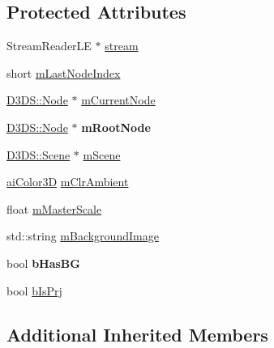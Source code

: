 \subsection*{Protected Attributes}
\begin{DoxyCompactItemize}
\item 
Stream\+Reader\+L\+E $\ast$ \hyperlink{class_assimp_1_1_discreet3_d_s_importer_a44f2ddb67a27b6cd5d82fb843061b33e}{stream}
\item 
short \hyperlink{class_assimp_1_1_discreet3_d_s_importer_a3415f396daf5ea21fcf7491d2c3068a3}{m\+Last\+Node\+Index}
\item 
\hyperlink{struct_assimp_1_1_d3_d_s_1_1_node}{D3\+D\+S\+::\+Node} $\ast$ \hyperlink{class_assimp_1_1_discreet3_d_s_importer_a8fa09748e9efd3f912c22f6fe6ff5988}{m\+Current\+Node}
\item 
\hypertarget{class_assimp_1_1_discreet3_d_s_importer_ad1f38d15ab029b6cb7a2167230165622}{\hyperlink{struct_assimp_1_1_d3_d_s_1_1_node}{D3\+D\+S\+::\+Node} $\ast$ {\bfseries m\+Root\+Node}}\label{class_assimp_1_1_discreet3_d_s_importer_ad1f38d15ab029b6cb7a2167230165622}

\item 
\hyperlink{struct_assimp_1_1_d3_d_s_1_1_scene}{D3\+D\+S\+::\+Scene} $\ast$ \hyperlink{class_assimp_1_1_discreet3_d_s_importer_a7c97a99e2984016900e585145b724ffc}{m\+Scene}
\item 
\hyperlink{structai_color3_d}{ai\+Color3\+D} \hyperlink{class_assimp_1_1_discreet3_d_s_importer_af0851fa68f040c21586eb3cff7238eb8}{m\+Clr\+Ambient}
\item 
float \hyperlink{class_assimp_1_1_discreet3_d_s_importer_a49ca0b573c71c8a33774bbdaf8ef1116}{m\+Master\+Scale}
\item 
std\+::string \hyperlink{class_assimp_1_1_discreet3_d_s_importer_a47da8a1c3911a7cde1e4d208a1569bac}{m\+Background\+Image}
\item 
\hypertarget{class_assimp_1_1_discreet3_d_s_importer_aa2d548359963663b2ba48d738fcf8563}{bool {\bfseries b\+Has\+B\+G}}\label{class_assimp_1_1_discreet3_d_s_importer_aa2d548359963663b2ba48d738fcf8563}

\item 
bool \hyperlink{class_assimp_1_1_discreet3_d_s_importer_a94d8fa10ee09295bc21f4375e7163f02}{b\+Is\+Prj}
\end{DoxyCompactItemize}
\subsection*{Additional Inherited Members}


